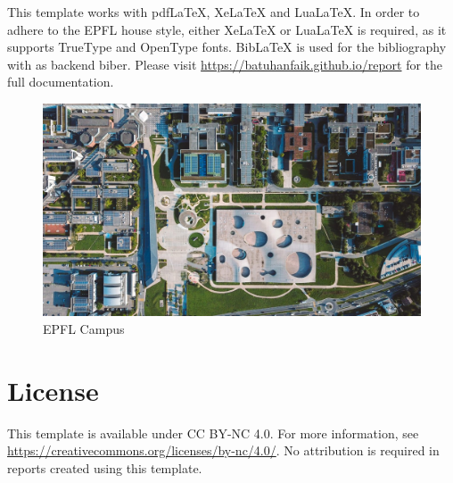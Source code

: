 \noindent This template works with pdfLaTeX, XeLaTeX and LuaLaTeX. In order to adhere to the EPFL house style, either XeLaTeX or LuaLaTeX is required, as it supports TrueType and OpenType fonts. BibLaTeX is used for the bibliography with as backend biber. Please visit \url{https://batuhanfaik.github.io/report} for the full documentation.

\begin{figure}[h]
    \centering
    \includegraphics[width=0.95\linewidth]{figures/campus.jpg}
    \caption{EPFL Campus}
\end{figure}

\section*{License}

\noindent This template is available under CC BY-NC 4.0. For more information, see \url{https://creativecommons.org/licenses/by-nc/4.0/}. No attribution is required in reports created using this template.
